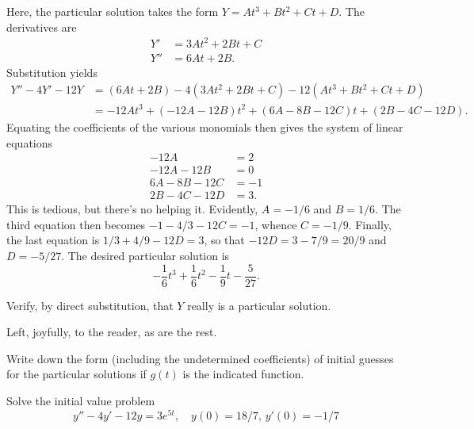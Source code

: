 \documentclass[answers,11pt]{exam}
\begin{document}
\begin{questions}
\begin{solution}
	Here, the particular solution takes the form $Y = At^3 + Bt^2 + Ct + D$. The derivatives are
    \begin{align*}
        Y' &= 3At^2 + 2Bt + C \\
        Y'' &= 6At + 2B.
    \end{align*}    
    Substitution yields 
    \begin{align*}
        Y'' - 4Y' - 12Y &= (6At + 2B) - 4(3At^2 + 2Bt + C) - 12(At^3 + Bt^2 + Ct + D)\\
        &= -12At^3 + (-12A - 12B)t^2 + (6A - 8B - 12C)t + (2B - 4C - 12D).
    \end{align*}
    Equating the coefficients of the various monomials then gives the system of linear equations
    \begin{align*}
        -12A &= 2 \\
        -12A - 12B &= 0 \\
        6A - 8B - 12C &= -1 \\
        2B - 4C - 12D &= 3.
    \end{align*}
    This is tedious, but there's no helping it. Evidently, $A = -1/6$ and $B = 1/6$. The third equation then becomes $-1 - 4/3 - 12C = -1$, whence $C = -1/9$. Finally, the last equation is $1/3 + 4/9 - 12D = 3$, so that $-12D = 3 - 7/9 = 20/9$ and $D = -5/27$. The desired particular solution is
    \[
        -\frac{1}{6}t^3 + \frac{1}{6}t^2 - \frac{1}{9}t - \frac{5}{27}.
    \]
\end{solution}

\question Verify, by direct substitution, that $Y$ really is a particular solution.

\begin{solution}
    Left, joyfully, to the reader, as are the rest.
\end{solution}

\question Write down the form (including the undetermined coefficients) of initial guesses for the particular solutions if $g(t)$ is the indicated function.


\question Solve the initial value problem 
\[
    y'' - 4y' - 12y = 3e^{5t}, \quad y(0) = 18/7,\, y'(0) = -1/7
\]
\end{questions}
\end{document}
